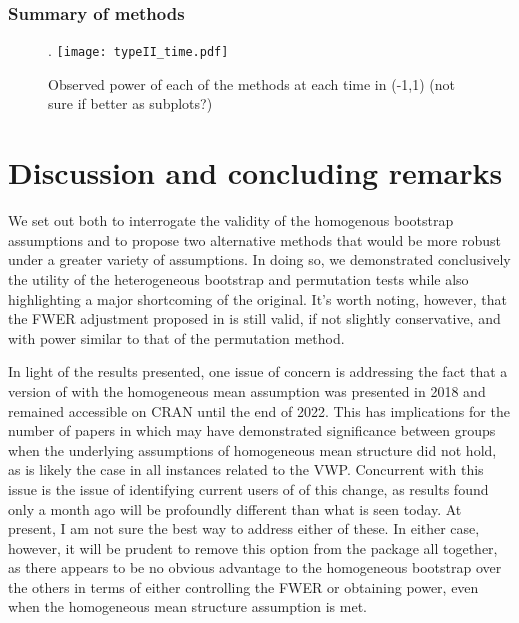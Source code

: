 \subsubsection{Summary of methods}



\begin{figure}[H]
\centering.
\texttt{[image: typeII\_time.pdf]}
\caption{Observed power of each of the methods at each time in (-1,1) (not sure if better as subplots?)}
\label{fig:time_power_plot}
\end{figure}


\section{Discussion and concluding remarks}

We set out both to interrogate the validity of the homogenous bootstrap assumptions and to propose two alternative methods that would be more robust under a greater variety of assumptions. In doing so, we demonstrated conclusively the utility of the heterogeneous bootstrap and permutation tests while also highlighting a major shortcoming of the original. It's worth noting, however, that the FWER adjustment proposed in \cite{oleson2017detecting} is still valid, if not slightly conservative, and with power similar to that of the permutation method. 

In light of the results presented, one issue of concern is addressing the fact that a version of  with the homogeneous mean assumption was presented in 2018 and remained accessible on CRAN until the end of 2022. This has implications for the number of papers in which  may have demonstrated significance between groups when the underlying assumptions of homogeneous mean structure did not hold, as is likely the case in all instances related to the VWP. Concurrent with this issue is the issue of identifying current users of  of this change, as results found only a month ago will be profoundly different than what is seen today. At present, I am not sure the best way to address either of these. In either case, however, it will be prudent to remove this option from the  package all together, as there appears to be no obvious advantage to the homogeneous bootstrap over the others in terms of either controlling the FWER or obtaining power, even when the homogeneous mean structure assumption is met.


